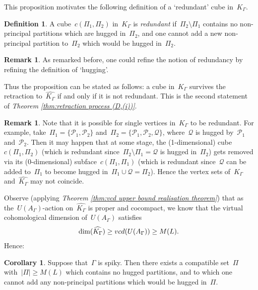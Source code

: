 \documentclass[11pt]{amsart}
\theoremstyle{definition}
\theoremstyle{definition}
\theoremstyle{definition}
\theoremstyle{definition}
\newtheorem{corollary}[theorem]{Corollary}
\newtheorem{remark}[theorem]{Remark}
\newtheorem{definition}[theorem]{Definition}
\newcommand{\calQ}{\mathcal{Q}}
\newcommand{\calP}{\mathcal{P}} %
\newcommand{\uag}{U(A_{\Gamma})} %
\newcommand{\vcduag}{\textsc{vcd}(U(A_{\Gamma}))} %
\newcommand{\spine}{K_{\Gamma}} %
\newcommand{\res}{\widehat{K_\Gamma}} %
\begin{document}
This proposition motivates the following definition of a `redundant' cube in~$\spine$. 

\begin{definition}\label{def:redundant cube}
    A cube~$c(\Pi_1, \Pi_2)$ in~$\spine$ is \emph{redundant} if~$\Pi_2 \setminus \Pi_1$ contains no non-principal partitions which are hugged in~$\Pi_2$, and one cannot add a new non-principal partition to~$\Pi_2$ which would be hugged in~$\Pi_2$.
\end{definition}

\begin{remark}
    As remarked before, one could refine the notion of redundancy by refining the definition of `hugging'. 
\end{remark}

Thus the proposition can be stated as follows: a cube in~$\spine$ survives the retraction to~$\res$ if and only if it is not redundant. This is the second statement of \emph{Theorem \ref{thm:retraction process (D,(i))}}.

\begin{remark}
    Note that it is possible for single vertices in~$\spine$ to be redundant. For example, take~$\Pi_1 = \{\calP_1, \calP_2\}$ and~$\Pi_2 = \{\calP_1, \calP_2, \calQ\}$, where~$\calQ$ is hugged by~$\calP_1$ and~$\calP_2$. Then it may happen that at some stage, the (1-dimensional) cube~$c(\Pi_1, \Pi_2)$ (which is redundant since~$\Pi_2 \setminus \Pi_1 = \calQ$ is hugged in~$\Pi_2$) gets removed via its (0-dimensional) subface~$c(\Pi_1, \Pi_1)$ (which is redundant since~$\calQ$ can be added to~$\Pi_1$ to become hugged in~$\Pi_1 \cup \calQ = \Pi_2$). Hence the vertex sets of~$\spine$ and~$\res$ may not coincide.
\end{remark}

Observe (applying \emph{Theorem \ref{thm:vcd upper bound realisation theorem}}) that as the~$\uag$-action on~$\res$ is proper and cocompact, we know that the virtual cohomological dimension of~$\uag$ satisfies \[\dim(\res) \geq \vcduag \geq M(L).\] Hence:

\begin{corollary}\label{cor:there exist M(L) sets of principals and you can't add a non-principal to them}
    Suppose that~$\Gamma$ is spiky. Then there exists a compatible set~$\Pi$ with~$\vert \Pi \vert \geq M(L)$ which contains no hugged partitions, and to which one cannot add any non-principal partitions which would be hugged in~$\Pi$. 
\end{corollary}
\end{document}
